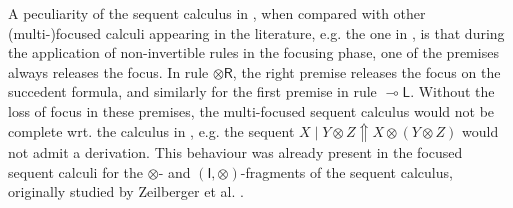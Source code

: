 \documentclass[runningheads]{llncs}
\newcommand{\tr}{\otimes \mathsf{R}}
\newcommand{\lleft}{{\multimap}\mathsf{L}}
\newcommand{\otR}{\tr}
\newcommand{\lolliL}{\lleft}
\newcommand{\ot}{\otimes}
\newcommand{\I}{\mathsf{I}}
\newcommand{\up}{\Uparrow}
\begin{document}
A peculiarity of the sequent calculus in , when compared with other (multi-)focused calculi appearing in the literature, e.g. the one in \cite{chaudhuri:canonical:2008}, is that during the application of non-invertible rules in the focusing phase, one of the premises always releases the focus. In rule $\otR$, the right premise releases the focus on the succedent formula, and similarly for the  first premise in rule $\lolliL$. Without the loss of focus in these premises, the multi-focused sequent calculus would not be complete wrt. the calculus in , e.g. the sequent $X \mid Y  \ot Z \up X \ot (Y \ot Z)$ would not admit a derivation. This behaviour was already present in the focused sequent calculi for the $\ot$- and $(\I,\ot)$-fragments of the sequent calculus, originally studied by Zeilberger et al. \cite{zeilberger:semiassociative:19,uustalu:sequent:2021}.
\end{document}
